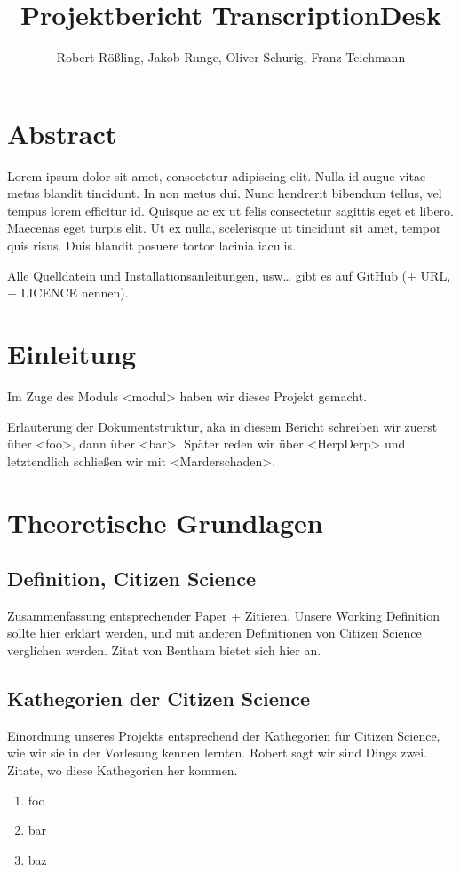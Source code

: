\documentclass{article}
\title{Projektbericht TranscriptionDesk}
\author{Robert Rößling, Jakob Runge, Oliver Schurig, Franz Teichmann}
\begin{document}
\maketitle

\section*{Abstract}
Lorem ipsum dolor sit amet, consectetur adipiscing elit. Nulla id augue vitae metus blandit tincidunt. In non metus dui. Nunc hendrerit bibendum tellus, vel tempus lorem efficitur id. Quisque ac ex ut felis consectetur sagittis eget et libero. Maecenas eget turpis elit. Ut ex nulla, scelerisque ut tincidunt sit amet, tempor quis risus. Duis blandit posuere tortor lacinia iaculis.

Alle Quelldatein und Installationsanleitungen, usw… gibt es auf GitHub (+ URL, + LICENCE nennen).

\tableofcontents
\newpage
\section{Einleitung}
Im Zuge des Moduls <modul> haben wir dieses Projekt gemacht.

Erläuterung der Dokumentstruktur, aka in diesem Bericht schreiben wir zuerst über <foo>, dann über <bar>.
Später reden wir über <HerpDerp> und letztendlich schließen wir mit <Marderschaden>.
\section{Theoretische Grundlagen}
\subsection{Definition, Citizen Science}
Zusammenfassung entsprechender Paper + Zitieren.
Unsere Working Definition sollte hier erklärt werden,
und mit anderen Definitionen von Citizen Science verglichen werden.
Zitat von Bentham bietet sich hier an.
\subsection{Kathegorien der Citizen Science}
Einordnung unseres Projekts entsprechend der Kathegorien für Citizen Science,
wie wir sie in der Vorlesung kennen lernten.
Robert sagt wir sind Dings zwei.
Zitate, wo diese Kathegorien her kommen.
\begin{enumerate}
\item foo
\item bar
\item baz
\end{enumerate}
\end{document}
